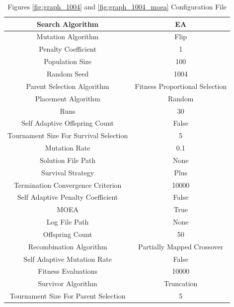 \documentclass{standalone}
\begin{document}
\begin{table}[!htb]
	\centering
	\caption{Figures \ref{fig:graph_1004} and \ref{fig:graph_1004_moea} Configuration File}
	\label{tab:graph_1004}
	\begin{tabular}{| c | c |}
		\hline
		Search Algorithm		& EA		 \\
		\hline
		Mutation Algorithm		& Flip		 \\
		\hline
		Penalty Coefficient		& 1		 \\
		\hline
		Population Size		& 100		 \\
		\hline
		Random Seed		& 1004		 \\
		\hline
		Parent Selection Algorithm		& Fitness Proportional Selection		 \\
		\hline
		Placement Algorithm		& Random		 \\
		\hline
		Runs		& 30		 \\
		\hline
		Self Adaptive Offspring Count		& False		 \\
		\hline
		Tournament Size For Survival Selection		& 5		 \\
		\hline
		Mutation Rate		& 0.1		 \\
		\hline
		Solution File Path		& None		 \\
		\hline
		Survival Strategy		& Plus		 \\
		\hline
		Termination Convergence Criterion		& 10000		 \\
		\hline
		Self Adaptive Penalty Coefficient		& False		 \\
		\hline
		MOEA		& True		 \\
		\hline
		Log File Path		& None		 \\
		\hline
		Offspring Count		& 50		 \\
		\hline
		Recombination Algorithm		& Partially Mapped Crossover		 \\
		\hline
		Self Adaptive Mutation Rate		& False		 \\
		\hline
		Fitness Evaluations		& 10000		 \\
		\hline
		Survivor Algorithm		& Truncation		 \\
		\hline
		Tournament Size For Parent Selection		& 5		 \\
		\hline
	\end{tabular}
\end{table}
\end{document}
